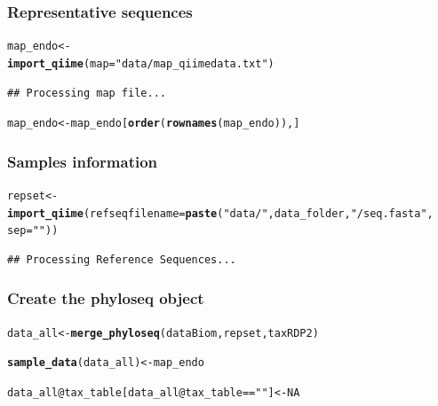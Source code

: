 \documentclass[12pt]{article}\usepackage[]{graphicx}\usepackage[]{color}
\makeatletter
\newcommand{\hlnum}[1]{\textcolor[rgb]{0.686,0.059,0.569}{#1}}%
\newcommand{\hlstr}[1]{\textcolor[rgb]{0.192,0.494,0.8}{#1}}%
\newcommand{\hlopt}[1]{\textcolor[rgb]{0,0,0}{#1}}%
\newcommand{\hlstd}[1]{\textcolor[rgb]{0.345,0.345,0.345}{#1}}%
\newcommand{\hlkwb}[1]{\textcolor[rgb]{0.69,0.353,0.396}{#1}}%
\newcommand{\hlkwc}[1]{\textcolor[rgb]{0.333,0.667,0.333}{#1}}%
\newcommand{\hlkwd}[1]{\textcolor[rgb]{0.737,0.353,0.396}{\textbf{#1}}}%
\newenvironment{kframe}{%
 \def\at@end@of@kframe{}%
 \ifinner\ifhmode%
  \def\at@end@of@kframe{\end{minipage}}%
  \begin{minipage}{\columnwidth}%
 \fi\fi%
 \def\FrameCommand##1{\hskip\@totalleftmargin \hskip-\fboxsep
 \colorbox{shadecolor}{##1}\hskip-\fboxsep
     \hskip-\linewidth \hskip-\@totalleftmargin \hskip\columnwidth}%
 \MakeFramed {\advance\hsize-\width
   \@totalleftmargin\z@ \linewidth\hsize
   \@setminipage}}%
 {\par\unskip\endMakeFramed%
 \at@end@of@kframe}
\newenvironment{knitrout}{}{} %
\numberwithin{figure}{section}
\makeatother
\begin{document}
 \subsubsection{Representative sequences}
\begin{knitrout}\small
{}\color{fgcolor}\begin{kframe}
\begin{alltt}
\hlstd{map_endo} \hlkwb{<-}
  \hlkwd{import_qiime}\hlstd{(}\hlkwc{map} \hlstd{=} \hlstr{"data/map_qiimedata.txt"}\hlstd{)}
\end{alltt}
\begin{verbatim}
## Processing map file...
\end{verbatim}
\begin{alltt}
\hlstd{map_endo} \hlkwb{<-} \hlstd{map_endo[}\hlkwd{order}\hlstd{(}\hlkwd{rownames}\hlstd{(map_endo)),]}
\end{alltt}
\end{kframe}
\end{knitrout}

 \subsubsection{Samples information}
\begin{knitrout}\small
{}\color{fgcolor}\begin{kframe}
\begin{alltt}
\hlstd{repset} \hlkwb{<-} \hlkwd{import_qiime}\hlstd{(}\hlkwc{refseqfilename} \hlstd{=} \hlkwd{paste}\hlstd{(}\hlstr{"data/"}\hlstd{, data_folder,} \hlstr{"/seq.fasta"}\hlstd{,}
                                              \hlkwc{sep} \hlstd{=} \hlstr{""}\hlstd{))}
\end{alltt}
\begin{verbatim}
## Processing Reference Sequences...
\end{verbatim}
\end{kframe}
\end{knitrout}

 \subsubsection{Create the phyloseq object}

\begin{knitrout}\small
{}\color{fgcolor}\begin{kframe}
\begin{alltt}
\hlstd{data_all} \hlkwb{<-} \hlkwd{merge_phyloseq}\hlstd{(dataBiom, repset, taxRDP2)}

\hlkwd{sample_data}\hlstd{(data_all)} \hlkwb{<-} \hlstd{map_endo}

\hlstd{data_all}\hlopt{@}\hlkwc{tax_table}\hlstd{[data_all}\hlopt{@}\hlkwc{tax_table} \hlopt{==} \hlstr{""}\hlstd{]} \hlkwb{<-} \hlnum{NA}
\end{alltt}
\end{kframe}
\end{knitrout}
\end{document}

